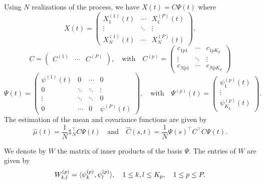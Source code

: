 Using $N$ realizations of the process, we have $X(t) = C\Psi(t)$ where
\begin{equation}
    X(t) = \begin{pmatrix}
                X_1^{(1)}(t) & \cdots & X_1^{(P)}(t)\\
                \vdots & \ddots & \vdots \\
                X_N^{(1)}(t) & \cdots & X_N^{(P)}(t)
            \end{pmatrix},
\end{equation}
\begin{equation}
    C = \begin{pmatrix}
            C^{(1)} & \cdots & C^{(P)} \\
        \end{pmatrix}, \quad\text{with}\quad
    C^{(p)} = \begin{pmatrix}
            c_{1p1} & \cdots & c_{1pK_p} \\
            \vdots & \ddots & \vdots \\
            c_{Np1} & \cdots & c_{NpK_p}
        \end{pmatrix}
\end{equation}
\begin{equation}
    \Psi(t) = \begin{pmatrix}
            \psi^{(1)}(t) & 0 & \cdots & 0\\
            0 & \ddots & \ddots & \vdots \\
            \vdots & \ddots & \ddots & 0 \\
            0 & \cdots & 0 & \psi^{(P)}(t)
        \end{pmatrix}, \quad\text{with}\quad
    \Psi^{(p)}(t) = \begin{pmatrix}
            \psi_1^{(p)}(t) \\
            \vdots \\
            \psi_{K_p}^{(p)}(t)
        \end{pmatrix}.
\end{equation}
The estimation of the mean and covariance functions are given by
\begin{equation}
    \widehat{\mu}(t) = \frac{1}{N}\mathds{1}_N^\top C\Psi(t) \quad\text{and}\quad \widehat{C}(s, t) = \frac{1}{N}\Psi(s)^\top C^\top C \Psi(t).
\end{equation}

We denote by $W$ the matrix of inner products of the basis $\Psi$. The entries of $W$ are given by
\begin{equation}
    W_{k, l}^{(p)} = \langle\psi_k^{(p)}, \psi_l^{(p)}\rangle, \quad 1 \leq k, l \leq K_p, \quad 1 \leq p \leq P.
\end{equation}

